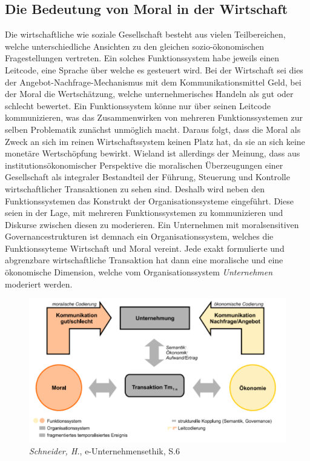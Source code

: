\documentclass[12pt]{article}
\begin{document}
\subsection{Die Bedeutung von Moral in der Wirtschaft}
Die wirtschaftliche wie soziale Gesellschaft besteht aus vielen Teilbereichen, welche unterschiedliche Ansichten zu den gleichen sozio-ökonomischen Fragestellungen vertreten. Ein solches Funktionssystem habe jeweils einen Leitcode, eine Sprache über welche es gesteuert wird. Bei der Wirtschaft sei dies der Angebot-Nachfrage-Mechanismus mit dem Kommunikationsmittel Geld, bei der Moral die Wertschätzung, welche unternehmerisches Handeln als gut oder schlecht bewertet. Ein Funktionssystem könne nur über seinen Leitcode kommunizieren, was das Zusammenwirken von mehreren Funktionssystemen zur selben Problematik zunächst unmöglich macht. Daraus folgt, dass die Moral als Zweck an sich im reinen Wirtschaftssystem keinen Platz hat, da sie an sich keine monetäre Wertschöpfung bewirkt. Wieland ist allerdings der Meinung, dass aus institutionsökonomischer Perspektive die moralischen Überzeugungen einer Gesellschaft als integraler Bestandteil der Führung, Steuerung und Kontrolle wirtschaftlicher Transaktionen zu sehen sind. Deshalb wird neben den Funktionssystemen das Konstrukt der Organisationssysteme eingeführt. Diese seien in der Lage, mit mehreren Funktionssystemen zu kommunizieren und Diskurse zwischen diesen zu moderieren. Ein Unternehmen mit moralsensitiven Governancestrukturen ist demnach ein Organisationssystem, welches die Funktionssyteme Wirtschaft und Moral vereint. Jede exakt formulierte und abgrenzbare wirtschaftliche Transaktion hat dann eine moralische und eine ökonomische Dimension, welche vom Organisationssystem \textit{Unternehmen} moderiert werden.
\FloatBarrier
\begin{figure}[ht!]
\centering
\includegraphics[width=.85\textwidth]{wieland1.png}
\caption{\textit{Schneider, H.}, e-Unternehmensethik, S.6}
\end{figure}
\end{document}
